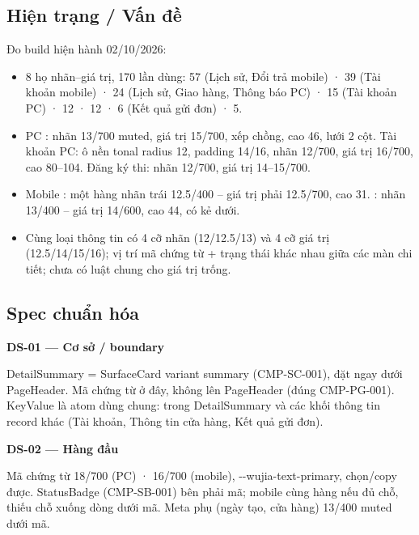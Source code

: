 \documentclass[11pt,a4paper]{report}
\begin{document}
\subsection*{Hiện trạng / Vấn đề}
Đo build hiện hành 02/\allowbreak{}10/\allowbreak{}2026:\par
\begin{itemize}
\item 8 họ nhãn–giá trị, 170 lần dùng:  57 (Lịch sử, Đổi trả mobile) ·  39 (Tài khoản mobile) ·  24 (Lịch sử, Giao hàng, Thông báo PC) ·  15 (Tài khoản PC) ·  12 ·  12 ·  6 (Kết quả gửi đơn) ·  5.
\item PC : nhãn 13/\allowbreak{}700 muted, giá trị 15/\allowbreak{}700, xếp chồng, cao 46, lưới 2 cột. Tài khoản PC: ô nền tonal radius 12, padding 14/\allowbreak{}16, nhãn 12/\allowbreak{}700, giá trị 16/\allowbreak{}700, cao 80–104. Đăng ký thi: nhãn 12/\allowbreak{}700, giá trị 14–15/\allowbreak{}700.
\item Mobile : một hàng nhãn trái 12.5/\allowbreak{}400 – giá trị phải 12.5/\allowbreak{}700, cao 31. : nhãn 13/\allowbreak{}400 – giá trị 14/\allowbreak{}600, cao 44, có kẻ dưới.
\item Cùng loại thông tin có 4 cỡ nhãn (12/\allowbreak{}12.5/\allowbreak{}13) và 4 cỡ giá trị (12.5/\allowbreak{}14/\allowbreak{}15/\allowbreak{}16); vị trí mã chứng từ + trạng thái khác nhau giữa các màn chi tiết; chưa có luật chung cho giá trị trống.
\end{itemize}
\subsection*{Spec chuẩn hóa}
\par\smallskip\textbf{DS-01 — Cơ sở / boundary}\par
DetailSummary = SurfaceCard variant summary (CMP-SC-001), đặt ngay dưới PageHeader. Mã chứng từ ở đây, không lên PageHeader (đúng CMP-PG-001). KeyValue là atom dùng chung: trong DetailSummary và các khối thông tin record khác (Tài khoản, Thông tin cửa hàng, Kết quả gửi đơn).\par

\par\smallskip\textbf{DS-02 — Hàng đầu}\par
Mã chứng từ 18/\allowbreak{}700 (PC) · 16/\allowbreak{}700 (mobile), -\kern0pt-\allowbreak{}wujia-\allowbreak{}text-\allowbreak{}primary, chọn/\allowbreak{}copy được. StatusBadge (CMP-SB-001) bên phải mã; mobile cùng hàng nếu đủ chỗ, thiếu chỗ xuống dòng dưới mã. Meta phụ (ngày tạo, cửa hàng) 13/\allowbreak{}400 muted dưới mã.\par
\end{document}
